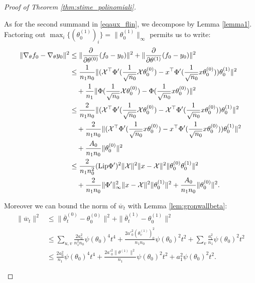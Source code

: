 \documentclass{article}
\theoremstyle{definition}
\theoremstyle{remark}
\numberwithin{equation}{section}
\newcommand{\X}{\mathcal{X}}
\newcommand{\s}{\psi}
\newcommand{\norm}[2]{
    \|#1\|_{#2}
}
\newcommand{\partv}[1]{
    \frac{\partial}{\partial #1}
}
\begin{document}
\begin{proof}[Proof of Theorem \ref{thm:stime_polinomiali}]
\begin{itemize}
    As for the second summand in \eqref{eqaux_flin}, we decompose by Lemma \ref{lemma1}.
    Factoring out $\max_i \{(\theta^{(1)}_0)_i\} = \norm{\theta^{(1)}_0}{\infty}$ permits us to write:
    \begin{align}
        \norm{\nabla_\theta f_0 - \nabla_\theta y_0}{}^2 &\le \norm{\partv{\theta^{(0)}}(f_0 - y_0)}{}^2+\norm{\partv{\theta^{(1)}}(f_0 - y_0)}{}^2 \\
        &\le \frac{1}{n_1n_0} \norm{(\X^\top\Phi'(\frac{1}{\sqrt{n_0}}\X\theta_0^{(0)})-x^\top\Phi'(\frac{1}{\sqrt{n_0}}x\theta_0^{(0)}))\theta_0^{(1)}}{}^2\\
        &\quad + \frac{1}{n_1}\norm{\Phi(\frac{1}{\sqrt{n_0}}\X\theta_0^{(0)})-\Phi(\frac{1}{\sqrt{n_0}}x\theta_0^{(0)})}{}^2 \\
        &\le \frac{2}{n_1n_0} \norm{(\X^\top\Phi'(\frac{1}{\sqrt{n_0}}\X\theta_0^{(0)})-\X^\top\Phi'(\frac{1}{\sqrt{n_0}}x\theta_0^{(0)}))\theta_0^{(1)}}{}^2\\
        &\quad +\frac{2}{n_1n_0} \norm{(\X^\top\Phi'(\frac{1}{\sqrt{n_0}}x\theta_0^{(0)})-x^\top\Phi'(\frac{1}{\sqrt{n_0}}x\theta_0^{(0)}))\theta_0^{(1)}}{}^2\\
        &\quad + \frac{A_0}{n_1n_0}\norm{\theta_0^{(0)}}{}^2 \\
        &\le \frac{2}{n_1n_0^2}(\textup{Lip}\Phi')^2\norm{\X}{}^2 \norm{x-\X}{}^2\norm{\theta_0^{(0)}\theta_0^{(1)}}{}^2\\
        &\quad +\frac{2}{n_1n_0} \norm{\Phi'}{\infty}^2\norm{x-\X}{}^2\norm{\theta_0^{(1)}}{}^2 + \frac{A_0}{n_1n_0}\norm{\theta_0^{(0)}}{}^2.
    \end{align}

    Moreover we can bound the norm of $\overline w_t$ with Lemma \ref{lem:gronwallbeta}:
    \begin{align}
        \label{eqaux_flinaux2}
        \norm{\overline w_t}{}^2 &\le \norm{\overline \theta_t^{(0)}-\theta_0^{(0)}}{}^2 + \norm{\overline \theta_t^{(1)}-\theta_0^{(1)}}{}^2 \\
        &\le \sum_{u,v}\frac{2a_0^2}{n_1^2n_0}\s(\theta_0)^4t^4 + \frac{2{a'}^2_0(\theta^{(1)}_v)^2_0}{n_1n_0}\s(\theta_0)^2t^2+ \sum_{v} \frac{a_1^2}{n_1}\s(\theta_0)^2t^2\\
        &\le \frac{2a_0^2}{n_1}\s(\theta_0)^4t^4 + \frac{2{a'}^2_0\norm{\theta^{(1)}}{}^2}{n_1}\s(\theta_0)^2t^2+ a_1^2\s(\theta_0)^2t^2.
    \end{align}


\end{itemize}
\end{proof}
\end{document}
